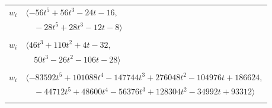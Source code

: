 \documentclass[11pt]{article}
\begin{document}
\begin{longtable}{@{}ll@{}}
$w_i$ & $\langle -56t^{5}+56t^{3}-24t-16,$\\
 & $\quad -28t^{5}+28t^{3}-12t-8\rangle$\\
\addlinespace[2pt]
\multicolumn{2}{@{}p{0.97\textwidth}@{}}{$i=38$, $D_i=4$, $\rho_{ij}$: $1{:}1, \allowbreak 2{:}1, \allowbreak 3{:}2, \allowbreak 9{:}2, \allowbreak 10{:}1, \allowbreak 13{:}2, \allowbreak 15{:}2, \allowbreak 23{:}1, \allowbreak 28{:}2, \allowbreak 30{:}1, \allowbreak 31{:}2$}\\
$w_i$ & $\langle 46t^{3}+110t^{2}+4t-32,$\\
 & $\quad 50t^{3}-26t^{2}-106t-28\rangle$\\
\addlinespace[2pt]
\multicolumn{2}{@{}p{0.97\textwidth}@{}}{$i=39$, $D_i=1944$, $\rho_{ij}$: $1{:}1, \allowbreak 2{:}2, \allowbreak 3{:}1, \allowbreak 7{:}1, \allowbreak 9{:}2, \allowbreak 10{:}2, \allowbreak 15{:}2, \allowbreak 17{:}2, \allowbreak 19{:}1, \allowbreak 21{:}1, \allowbreak 27{:}2, \allowbreak 29{:}1, \allowbreak 34{:}1$}\\
$w_i$ & $\langle -83592t^{5}+101088t^{4}-147744t^{3}+276048t^{2}-104976t+186624,$\\
 & $\quad -44712t^{5}+48600t^{4}-56376t^{3}+128304t^{2}-34992t+93312\rangle$\\
\addlinespace[2pt]
\end{longtable}
\endgroup
\end{document}
